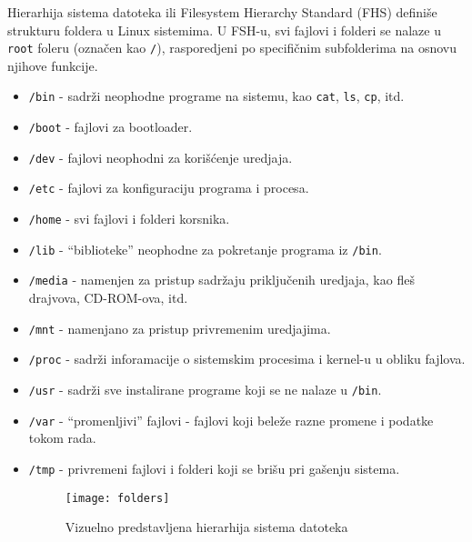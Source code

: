 Hierarhija sistema datoteka ili Filesystem Hierarchy Standard (FHS) definiše strukturu foldera u Linux sistemima. U FSH-u, svi fajlovi i folderi se nalaze u \texttt{root} foleru (označen kao \texttt{/}), rasporedjeni po specifičnim subfolderima na osnovu njihove funkcije.
\begin{itemize}
\item \texttt{/bin} - sadrži neophodne programe na sistemu, kao \texttt{cat}, \texttt{ls}, \texttt{cp}, itd.

\item \texttt{/boot} - fajlovi za bootloader.

\item \texttt{/dev} - fajlovi neophodni za korišćenje uredjaja.

\item \texttt{/etc} - fajlovi za konfiguraciju programa i procesa.

\item \texttt{/home} - svi fajlovi i folderi korsnika.

\item \texttt{/lib} - ``biblioteke'' neophodne za pokretanje programa iz \texttt{/bin}.

\item \texttt{/media} - namenjen za pristup sadržaju priključenih uredjaja, kao fleš drajvova, CD-ROM-ova, itd.

\item \texttt{/mnt} - namenjano za pristup privremenim uredjajima.

\item \texttt{/proc} - sadrži inforamacije o sistemskim procesima i kernel-u u obliku fajlova.

\item \texttt{/usr} - sadrži sve instalirane programe koji se ne nalaze u \texttt{/bin}.

\item \texttt{/var} - ``promenljivi'' fajlovi - fajlovi koji beleže razne promene i podatke tokom rada.

\item \texttt{/tmp} - privremeni fajlovi i folderi koji se brišu pri gašenju sistema.

\begin{figure}[H]
	\centering
	\texttt{[image: folders]}
	\caption{Vizuelno predstavljena hierarhija sistema datoteka}
\end{figure}

\end{itemize}
